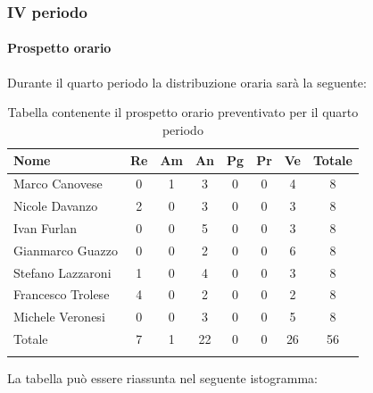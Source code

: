 \subsubsection{IV periodo}
\paragraph{Prospetto orario}
Durante il quarto periodo la distribuzione oraria sarà la seguente:

\begin{longtable}{|l|c|c|c|c|c|c|c|}
	\hline
	\rowcolor{lighter-grayer}
	\textbf{Nome}     & \textbf{Re} & \textbf{Am} & \textbf{An} & \textbf{Pg} & \textbf{Pr} & \textbf{Ve} & \textbf{Totale} \\
	\hline
	\endfirsthead

	\hline
	Marco Canovese    & 0           & 1           & 3           & 0           & 0           & 4           & 8               \\
	\hline
	\hline
	Nicole Davanzo    & 2           & 0           & 3           & 0           & 0           & 3           & 8               \\
	\hline
	\hline
	Ivan Furlan       & 0           & 0           & 5           & 0           & 0           & 3           & 8               \\
	\hline
	\hline
	Gianmarco Guazzo  & 0           & 0           & 2           & 0           & 0           & 6           & 8               \\
	\hline
	\hline
	Stefano Lazzaroni & 1           & 0           & 4           & 0           & 0           & 3           & 8               \\
	\hline
	\hline
	Francesco Trolese & 4           & 0           & 2           & 0           & 0           & 2           & 8               \\
	\hline
	\hline
	Michele Veronesi  & 0           & 0           & 3           & 0           & 0           & 5           & 8               \\
	\hline
	\hline
	Totale            & 7           & 1           & 22          & 0           & 0           & 26          & 56              \\
	\hline
	\rowcolor{white}
	\caption{Tabella contenente il prospetto orario preventivato per il quarto periodo}
\end{longtable}


La tabella può essere riassunta nel seguente istogramma:

